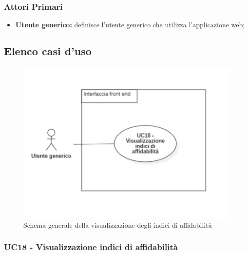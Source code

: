 \subsubsection{Attori Primari}\label{UFattoriPrimariFac}
\begin{itemize}
	\item \textbf{Utente generico:} definisce l'utente generico che utilizza l'applicazione web;
\end{itemize}

\subsection{Elenco casi d'uso}\label{CasiDUsoCasiDUsoFacoltativiTraUnUtenteEIlFrontEndElencoCasiDUso}



\begin{center}
	\begin{figure}[H]
		\centering\includegraphics[scale=0.7]{../immagini/attori_casi/UC_18.png}
		\caption{Schema generale della visualizzazione degli indici di affidabilità}
	\end{figure}
\end{center}


\subsubsection{UC18 - Visualizzazione indici di affidabilità}\label{CasiDUsoCasiDUsoFacoltativiTraUnUtenteEIlFrontEndElencoCasiDUsoUC10VisualizzazioneIndiciDiAffidabilita}


